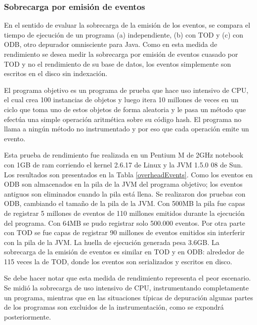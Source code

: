 \documentclass[12pt,legalpaper]{report}
\begin{document}
			\subsubsection{Sobrecarga por emisión de eventos}

En el sentido de evaluar la sobrecarga de la emisión de los eventos, se compara el tiempo de ejecución de un programa (a) independiente, (b) con TOD y (c) con ODB, otro depurador omnisciente para Java.  Como en esta medida de rendimiento se desea medir la sobrecarga por emisión de eventos cuasado por TOD y no el rendimiento de su base de datos, los eventos simplemente son escritos en el disco sin indexación.

El programa objetivo es un programa de prueba que hace uso intensivo de CPU, el cual crea 100 instancias de objetos y luego itera 10 millones de veces en un ciclo que toma uno de estos objetos de forma aleatoria y le pasa un método que efectúa una simple operación aritmética sobre su código hash.  El programa no llama a ningún método no instrumentado y por eso que cada operación emite un evento.
 
Esta prueba de rendimiento fue realizada en un Pentium M de 2GHz notebook con 1GB de ram corriendo el kernel 2.6.17 de Linux y la JVM 1.5.0 08 de Sun.  Los resultados son presentados en la Tabla \ref{overheadEvents}.  Como los eventos en ODB son almacenados en la pila de la JVM del programa objetivo; los eventos antiguos son eliminados cuando la pila está llena.  Se realizaron dos pruebas con ODB, cambiando el tamaño de la pila de la JVM.  Con 500MB la pila fue capas de registrar 5 millones de eventos de 110 millones emitidos durante la ejecución del programa.  Con 64MB se pudo registrar solo 500.000 eventos.  Por otra parte con TOD se fue capas de registrar 90 millones de eventos emitidos sin interferir con la pila de la JVM.  La huella de ejecución generada pesa 3.6GB.  La sobrecarga de la emisión de eventos es similar en TOD y en ODB: alrededor de 115 veces la de TOD, donde los eventos son serializados y escritos en disco.

Se debe hacer notar que esta medida de rendimiento representa el peor escenario.  Se midió la sobrecarga de uso intensivo de CPU, instrumentando completamente un programa, mientras que en las situaciones típicas de depuración algunas partes de los programas son excluidos de la instrumentación, como se expondrá posteriormente.
\end{document}
